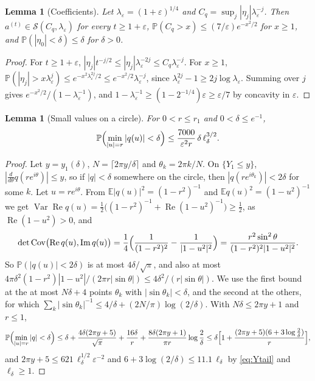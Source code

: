 \documentclass[11pt]{amsart}
\newtheorem{lemma}[theorem]{Lemma}
\theoremstyle{definition}
\theoremstyle{remark}
\numberwithin{equation}{section}
\newcommand{\E}{\mathbb{E}}
\newcommand{\PP}{\mathbb{P}}
\newcommand{\eps}{\varepsilon}
\DeclareMathOperator{\re}{Re}
\DeclareMathOperator{\im}{Im}
\begin{document}
\begin{lemma}[Coefficients]\label{lem:coeff}
Let $\lambda_\eps=(1+\eps)^{1/4}$ and $C_q=\sup_j|\eta_j|\lambda_\eps^{-j}$. Then $a^{(t)}\in\mathcal S(C_q,\lambda_\eps)$ for every $t\ge1+\eps$, $\PP(C_q>x)\le(7/\eps)e^{-x^2/2}$ for $x\ge1$, and $\PP(|\eta_0|<\delta)\le\delta$ for $\delta>0$.
\end{lemma}

\begin{proof}
For $t\ge1+\eps$, $|\eta_j|t^{-j/2}\le|\eta_j|\lambda_\eps^{-2j}\le C_q\lambda_\eps^{-j}$. For $x\ge1$, $\PP(|\eta_j|>x\lambda_\eps^j)\le e^{-x^2\lambda_\eps^{2j}/2}\le e^{-x^2/2}\lambda_\eps^{-j}$, since $\lambda_\eps^{2j}-1\ge2j\log\lambda_\eps$. Summing over $j$ gives $e^{-x^2/2}/(1-\lambda_\eps^{-1})$, and $1-\lambda_\eps^{-1}\ge(1-2^{-1/4})\eps\ge\eps/7$ by concavity in $\eps$.
\end{proof}

\begin{lemma}[Small values on a circle]\label{lem:circle-small}
For $0<r\le r_1$ and $0<\delta\le e^{-1}$,
\[
\PP\Bigl(\min_{|u|=r}|q(u)|<\delta\Bigr)\le\frac{7000}{\eps^2r}\,\delta\,\ell_\delta^{3/2}.
\]
\end{lemma}

\begin{proof}
Let $y=y_1(\delta)$, $N=\lceil2\pi y/\delta\rceil$ and $\theta_k=2\pi k/N$. On $\{Y_1\le y\}$, $|\frac{d}{d\theta}q(re^{i\theta})|\le y$, so if $|q|<\delta$ somewhere on the circle, then $|q(re^{i\theta_k})|<2\delta$ for some $k$. Let $u=re^{i\theta}$. From $\E|q(u)|^2=(1-r^2)^{-1}$ and $\E q(u)^2=(1-u^2)^{-1}$ we get $\operatorname{Var}\re q(u)=\frac12\bigl((1-r^2)^{-1}+\re(1-u^2)^{-1}\bigr)\ge\frac12$, as $\re(1-u^2)>0$, and
\[
\det\operatorname{Cov}\bigl(\re q(u),\im q(u)\bigr)=\frac14\Bigl(\frac1{(1-r^2)^2}-\frac1{|1-u^2|^2}\Bigr)=\frac{r^2\sin^2\theta}{(1-r^2)^2|1-u^2|^2}.
\]
So $\PP(|q(u)|<2\delta)$ is at most $4\delta/\sqrt\pi$, and also at most $4\pi\delta^2(1-r^2)|1-u^2|/(2\pi r|\sin\theta|)\le4\delta^2/(r|\sin\theta|)$. We use the first bound at the at most $N\delta+4$ points $\theta_k$ with $|\sin\theta_k|<\delta$, and the second at the others, for which $\sum_k|\sin\theta_k|^{-1}\le4/\delta+(2N/\pi)\log(2/\delta)$. With $N\delta\le2\pi y+1$ and $r\le1$,
\[
\PP\Bigl(\min_{|u|=r}|q|<\delta\Bigr)\le\delta+\frac{4\delta(2\pi y+5)}{\sqrt\pi}+\frac{16\delta}r+\frac{8\delta(2\pi y+1)}{\pi r}\log\frac2\delta\le\delta\Bigl[1+\frac{(2\pi y+5)(6+3\log\frac2\delta)}r\Bigr],
\]
and $2\pi y+5\le621\,\ell_\delta^{1/2}\eps^{-2}$ and $6+3\log(2/\delta)\le11.1\,\ell_\delta$ by \eqref{eq:Ytail} and $\ell_\delta\ge1$.
\end{proof}
\end{document}
